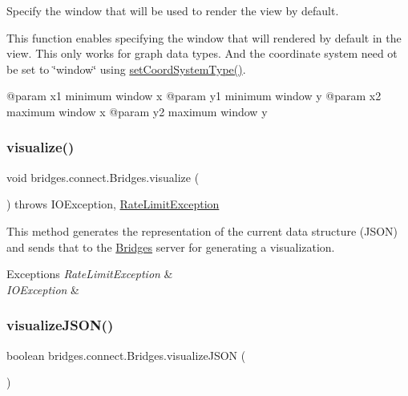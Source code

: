 Specify the window that will be used to render the view by default. 

This function enables specifying the window that will rendered by default in the view. This only works for graph data types. And the coordinate system need ot be set to \char`\"{}window\char`\"{} using \hyperlink{classbridges_1_1connect_1_1_bridges_ade4a9c43e2b608e6b3dc774b73f95749}{set\+Coord\+System\+Type()}. \begin{DoxyVerb}@param x1   minimum window x
@param y1   minimum window y
@param x2   maximum window x
@param y2   maximum window y\end{DoxyVerb}
 \mbox{\label{classbridges_1_1connect_1_1_bridges_a1853d64ffb8675ba2ec227a2b819cd24}} 
\subsubsection{\texorpdfstring{visualize()}{visualize()}}
{\footnotesize\ttfamily void bridges.\+connect.\+Bridges.\+visualize (\begin{DoxyParamCaption}{ }\end{DoxyParamCaption}) throws I\+O\+Exception, \hyperlink{classbridges_1_1validation_1_1_rate_limit_exception}{Rate\+Limit\+Exception}}

This method generates the representation of the current data structure (J\+S\+ON) and sends that to the \hyperlink{classbridges_1_1connect_1_1_bridges}{Bridges} server for generating a visualization.


\begin{DoxyExceptions}{Exceptions}
{\em Rate\+Limit\+Exception} & \\
\hline
{\em I\+O\+Exception} & \\
\hline
\end{DoxyExceptions}
\mbox{\label{classbridges_1_1connect_1_1_bridges_afd3c63780396e92c94c923037385b31d}} 
\subsubsection{\texorpdfstring{visualize\+J\+S\+O\+N()}{visualizeJSON()}}
{\footnotesize\ttfamily boolean bridges.\+connect.\+Bridges.\+visualize\+J\+S\+ON (\begin{DoxyParamCaption}{ }\end{DoxyParamCaption})}

